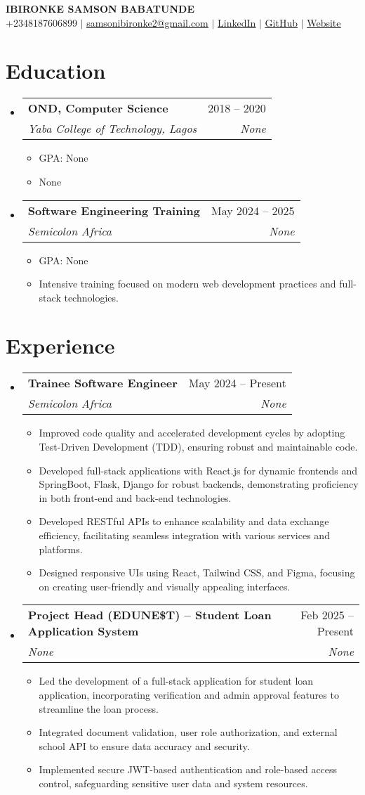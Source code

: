 \documentclass[letterpaper,11pt]{article}
\makeatletter
\newcommand{\resumeItem}[1]{
  \item\small{
    {#1 \vspace{-2pt}}
  }
}
\newcommand{\resumeSubheading}[4]{
  \vspace{-2pt}\item
    \begin{tabular*}{0.97\textwidth}[t]{l@{\extracolsep{\fill}}r}
      \textbf{#1} & #2 \\
      \textit{\small#3} & \textit{\small #4} \\
    \end{tabular*}\vspace{-7pt}
}
\newcommand{\resumeSubHeadingListStart}{\begin{itemize}[leftmargin=0.15in, label={}]}
\newcommand{\resumeSubHeadingListEnd}{\end{itemize}}
\newcommand{\resumeItemListStart}{\begin{itemize}}
\newcommand{\resumeItemListEnd}{\end{itemize}\vspace{-5pt}}
\makeatother
\begin{document}
\begin{center}
    \textbf{\Huge \scshape IBIRONKE SAMSON BABATUNDE} \\ \vspace{1pt}
    \small +2348187606899 $|$ \href{mailto:samsonibironke2@gmail.com}{\underline{samsonibironke2@gmail.com}} $|$ \href{https://None}{\underline{LinkedIn}} $|$ \href{https://None}{\underline{GitHub}} $|$ \href{https://None}{\underline{Website}}
\end{center}

\section{Education}
  \resumeSubHeadingListStart
    \resumeSubheading
      {OND, Computer Science}{2018 -- 2020}
      {Yaba College of Technology, Lagos}{None}
      \resumeItemListStart
        \resumeItem{GPA: None}
        \resumeItem{None}
      \resumeItemListEnd
    \resumeSubheading
      {Software Engineering Training}{May 2024 -- 2025}
      {Semicolon Africa}{None}
      \resumeItemListStart
        \resumeItem{GPA: None}
        \resumeItem{Intensive training focused on modern web development practices and full-stack technologies.}
      \resumeItemListEnd
  \resumeSubHeadingListEnd

\section{Experience}
  \resumeSubHeadingListStart
    \resumeSubheading
      {Trainee Software Engineer}{May 2024 -- Present}
      {Semicolon Africa}{None}
      \resumeItemListStart
        \resumeItem{Improved code quality and accelerated development cycles by adopting Test-Driven Development (TDD), ensuring robust and maintainable code.}
        \resumeItem{Developed full-stack applications with React.js for dynamic frontends and SpringBoot, Flask, Django for robust backends, demonstrating proficiency in both front-end and back-end technologies.}
        \resumeItem{Developed RESTful APIs to enhance scalability and data exchange efficiency, facilitating seamless integration with various services and platforms.}
        \resumeItem{Designed responsive UIs using React, Tailwind CSS, and Figma, focusing on creating user-friendly and visually appealing interfaces.}
      \resumeItemListEnd
    \resumeSubheading
      {Project Head (EDUNE\$T) -- Student Loan Application System}{Feb 2025 -- Present}
      {None}{None}
      \resumeItemListStart
        \resumeItem{Led the development of a full-stack application for student loan application, incorporating verification and admin approval features to streamline the loan process.}
        \resumeItem{Integrated document validation, user role authorization, and external school API to ensure data accuracy and security.}
        \resumeItem{Implemented secure JWT-based authentication and role-based access control, safeguarding sensitive user data and system resources.}
      \resumeItemListEnd
  \resumeSubHeadingListEnd
\end{document}
